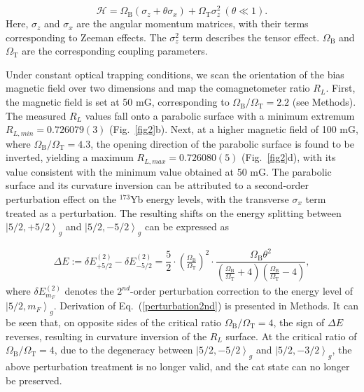 \documentclass[pdflatex,sn-nature,centre]{sn-jnl}%
\begin{document}
\begin{equation}\label{Ham}
    \mathscr H = \Omega_{\mathrm B}(\sigma_{z}+\theta\sigma_{x})+\Omega_{\mathrm T}\sigma_{z}^2\ (\theta\ll1).
\end{equation}
Here, $\sigma_{z}$ and $\sigma_{x}$ are the angular momentum matrices, with their terms corresponding to Zeeman effects. The $\sigma_{z}^2$ term describes the tensor effect. $\Omega_{\mathrm B}$ and $\Omega_{\mathrm T}$ are the corresponding coupling parameters.

Under constant optical trapping conditions, we scan the orientation of the bias magnetic field over two dimensions and map the comagnetometer ratio $R_L$. First, the magnetic field is set at 50 mG, corresponding to $\Omega_{\mathrm B}/\Omega_{\mathrm T}=2.2$ (see Methods). The measured $R_L$ values fall onto a parabolic surface with a minimum extremum $R_{L,min} = 0.726079(3)$ (Fig.~\ref{fig2}b). Next, at a higher magnetic field of 100 mG, where $\Omega_{\mathrm B}/\Omega_{\mathrm T}=4.3$, the opening direction of the parabolic surface is found to be inverted, yielding a maximum $R_{L,max} = 0.726080(5)$ (Fig.~\ref{fig2}d), with its value consistent with the minimum value obtained at 50 mG. The parabolic surface and its curvature inversion can be attributed to a second-order perturbation effect on the $^{173}$Yb energy levels, with the transverse $\sigma_{x}$ term treated as a perturbation. The resulting shifts on the energy splitting between $\left\vert5/2,+5/2\right\rangle_g$ and $\left\vert5/2,-5/2\right\rangle_g$ can be expressed as 

\begin{equation}\label{perturbation2nd}
\begin{aligned}
    \Delta E := \delta E_{+5/2}^{(2)}-\delta E_{-5/2}^{(2)} 
    = \dfrac{5}{2} \cdot \left(\frac{\Omega_{\mathrm B}}{\Omega_{\mathrm T}}\right)^2 \cdot \dfrac{ \Omega_{\mathrm B} \theta^2}  {(\frac{\Omega_{\mathrm B}}{\Omega_{\mathrm T}} + 4)(\frac{\Omega_{\mathrm B}}{\Omega_{\mathrm T}} - 4)} ,
\end{aligned}
\end{equation}
where $\delta E_{m_F}^{(2)}$ denotes the $2^{nd}$-order perturbation correction to the energy level of $\left\vert5/2,m_F\right\rangle_{g}$. Derivation of Eq.~(\ref{perturbation2nd}) is presented in Methods. It can be seen that, on opposite sides of the critical ratio $\Omega_{\mathrm B}/\Omega_{\mathrm T}=4$, the sign of $\Delta E$ reverses, resulting in
curvature inversion of the $R_L$ surface. At the critical ratio of $\Omega_{\mathrm B}/\Omega_{\mathrm T}=4$, due to the degeneracy between $\left\vert5/2,-5/2\right\rangle_g$ and $\left\vert5/2,-3/2\right\rangle_g$, the above perturbation treatment is no longer valid, and the cat state can no longer be preserved.
\end{document}
